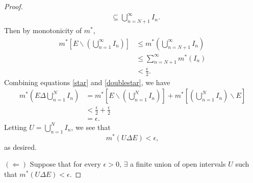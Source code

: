 \documentclass{article}
\begin{document}
\begin{proof}
\begin{align}
		& \subseteq \bigcup_{n=N+1}^{\infty}I_n.
	\end{align}
	Then by monotonicity of $m^*$,
	\begin{align}\label{doublestar}
		m^*\left[E\backslash \left(\bigcup_{n=1}^{\infty}I_n\right)\right] &\leq m^*\left(\bigcup_{n=N+1}^{\infty}I_n\right) \\
		&\leq \sum_{n=N+1}^{\infty}m^*(I_n) \\
		&< \frac{\epsilon}{2}.
	\end{align}
	Combining equations \eqref{star} and \eqref{doublestar}, we have
	\begin{align}
		m^*\left(E \Delta \bigcup_{n=1}^N I_n\right)&= m^*\left[E \backslash \left(\bigcup_{n=1}^N I_n\right)\right] + m^*\left[\left(\bigcup_{n=1}^N I_n\right) \backslash E\right] \\
		&< \frac{\epsilon}{2} + \frac{\epsilon}{2} \\
		&= \epsilon.
	\end{align}
	Letting $U = \bigcup_{n=1}^N I_n$, we see that
	\begin{equation}
		m^*(U \Delta E) < \epsilon,
	\end{equation}
	as desired.
	
	$(\Leftarrow)$ Suppose that for every $\epsilon > 0$, $\exists$ a finite union of open intervals $U$ such that $m^*(U \Delta E) < \epsilon$.
	

\end{proof}
\end{document}
